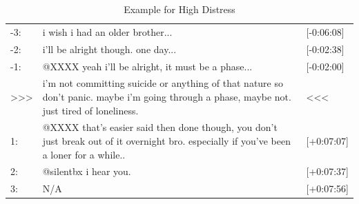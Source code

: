 \documentclass[11pt]{article}
\begin{document}
\begin{table}[h]
\footnotesize
\begin{tabular}{|p{0.8cm}|p{4.25cm}|p{1.2cm}|}
\hline
-3:                                  & i wish i had an older brother...                                                                                                             & {[}-0:06:08{]}              \\
-2:                                  & i'll be alright though. one day...                                                                                                           & {[}-0:02:38{]}              \\
-1:                                  & @XXXX yeah i'll be alright, it must be a phase...                                                                                          & {[}-0:02:00{]}              \\
\textgreater\textgreater\textgreater & i'm not committing suicide or anything of that nature so don't panic. maybe i'm going through a phase, maybe not. just tired of loneliness.  & \textless\textless\textless \\
1:                                   & @XXXX that's easier said then done though, you don't just break out of it overnight bro. especially if you've been a loner for a while.. & {[}+0:07:07{]}              \\
2:                                   & @silentbx i hear you.                                                                                                                        & {[}+0:07:37{]}              \\
3:                                   &   N/A                                                                                                                                           & {[}+0:07:56{]}              \\ \hline
\end{tabular}
\caption{Example for High Distress}
\end{table}
\end{document}

